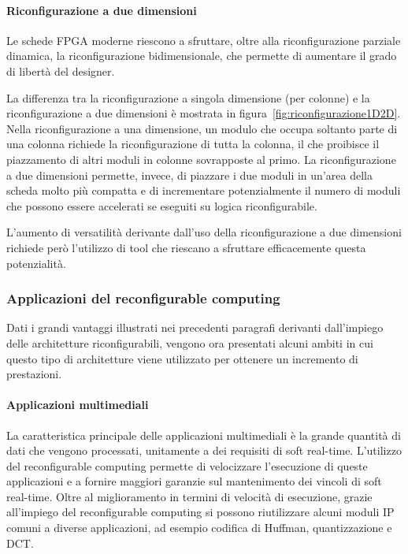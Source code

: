 \paragraph{Riconfigurazione a due dimensioni}
Le schede \ac{FPGA} moderne riescono a sfruttare, oltre alla riconfigurazione parziale
dinamica, la riconfigurazione bidimensionale, che permette di aumentare il grado di
libertà del designer.

La differenza tra la riconfigurazione a singola dimensione (per colonne) e la
riconfigurazione a due dimensioni è mostrata in figura~\ref{fig:riconfigurazione1D2D}.
Nella riconfigurazione a una dimensione, un modulo che occupa soltanto parte di una
colonna richiede la riconfigurazione di tutta la colonna, il che proibisce il piazzamento
di altri moduli in colonne sovrapposte al primo. La riconfigurazione a due dimensioni
permette, invece, di piazzare i due moduli in un'area della scheda molto più compatta e di
incrementare potenzialmente il numero di moduli che possono essere accelerati se eseguiti
su logica riconfigurabile.

L'aumento di versatilità derivante dall'uso della riconfigurazione a due dimensioni
richiede però l'utilizzo di tool che riescano a sfruttare efficacemente questa
potenzialità.



\subsubsection{Applicazioni del reconfigurable computing}
Dati i grandi vantaggi illustrati nei precedenti paragrafi derivanti dall'impiego delle
architetture riconfigurabili, vengono ora presentati alcuni ambiti in cui questo tipo
di architetture viene utilizzato per ottenere un incremento di prestazioni.

\paragraph{Applicazioni multimediali}
La caratteristica principale delle applicazioni multimediali è la grande quantità di dati che
vengono processati, unitamente a dei requisiti di soft real-time. L'utilizzo del reconfigurable
computing permette di velocizzare l'esecuzione di queste applicazioni e a fornire maggiori garanzie
sul mantenimento dei vincoli di soft real-time. Oltre al miglioramento
in termini di velocità di esecuzione, grazie all'impiego del reconfigurable computing si possono
riutilizzare alcuni moduli \ac{IP} comuni a diverse applicazioni, ad esempio codifica di
Huffman, quantizzazione e \ac{DCT}.

